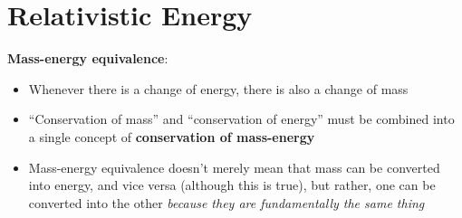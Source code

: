 \section{Relativistic Energy}
%  
%
%  
%
%    
%
%
%
%
%
%
%  
%
\textbf{Mass-energy equivalence}:
\begin{itemize}
\item Whenever there is a change of energy, there is also a change of mass
\item ``Conservation of mass'' and ``conservation of energy'' must be
  combined into a single concept of \textbf{conservation of mass-energy}
\item Mass-energy equivalence doesn't merely mean that mass can be converted
  into energy, and vice versa (although this is true), but rather, one can be
  converted into the other
  \emph{because they are fundamentally the same thing}
\end{itemize}
%
%
%
%
%
%
%
